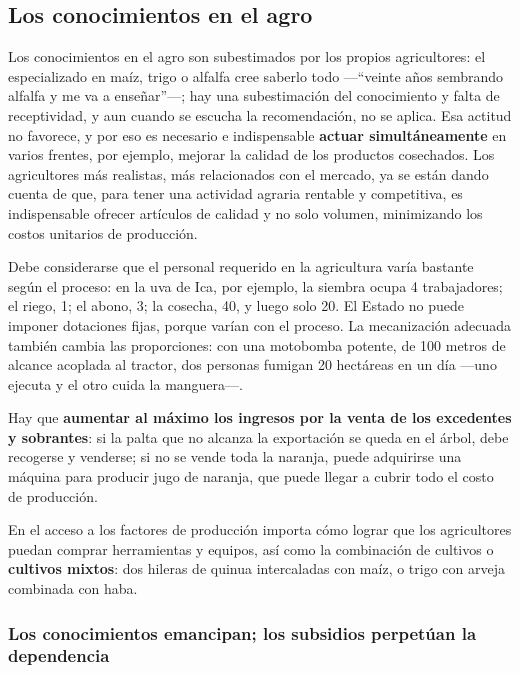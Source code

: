 \documentclass[
  man,
  floatsintext,
  longtable,
  a4paper,
  nolmodern,
  notxfonts,
  notimes,
  12pt,
  colorlinks=true,linkcolor=blue,citecolor=blue,urlcolor=blue]{apa7}
\begin{document}
\subsection{Los conocimientos en el
agro}\label{los-conocimientos-en-el-agro}

Los conocimientos en el agro son subestimados por los propios
agricultores: el especializado en maíz, trigo o alfalfa cree saberlo
todo ---``veinte años sembrando alfalfa y me va a enseñar''---; hay una
subestimación del conocimiento y falta de receptividad, y aun cuando se
escucha la recomendación, no se aplica. Esa actitud no favorece, y por
eso es necesario e indispensable \textbf{actuar simultáneamente} en
varios frentes, por ejemplo, mejorar la calidad de los productos
cosechados. Los agricultores más realistas, más relacionados con el
mercado, ya se están dando cuenta de que, para tener una actividad
agraria rentable y competitiva, es indispensable ofrecer artículos de
calidad y no solo volumen, minimizando los costos unitarios de
producción.

Debe considerarse que el personal requerido en la agricultura varía
bastante según el proceso: en la uva de Ica, por ejemplo, la siembra
ocupa 4 trabajadores; el riego, 1; el abono, 3; la cosecha, 40, y luego
solo 20. El Estado no puede imponer dotaciones fijas, porque varían con
el proceso. La mecanización adecuada también cambia las proporciones:
con una motobomba potente, de 100 metros de alcance acoplada al tractor,
dos personas fumigan 20 hectáreas en un día ---uno ejecuta y el otro
cuida la manguera---.

Hay que \textbf{aumentar al máximo los ingresos por la venta de los
excedentes y sobrantes}: si la palta que no alcanza la exportación se
queda en el árbol, debe recogerse y venderse; si no se vende toda la
naranja, puede adquirirse una máquina para producir jugo de naranja, que
puede llegar a cubrir todo el costo de producción.

En el acceso a los factores de producción importa cómo lograr que los
agricultores puedan comprar herramientas y equipos, así como la
combinación de cultivos o \textbf{cultivos mixtos}: dos hileras de
quinua intercaladas con maíz, o trigo con arveja combinada con haba.

\subsubsection{Los conocimientos emancipan; los subsidios perpetúan la
dependencia}\label{los-conocimientos-emancipan-los-subsidios-perpetuxfaan-la-dependencia}
\end{document}
